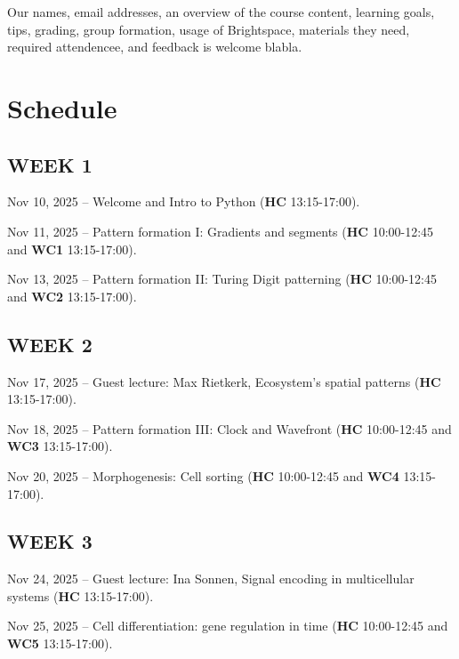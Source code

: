 \documentclass[
  letterpaper,
  DIV=11,
  numbers=noendperiod]{scrreprt}
\theoremstyle{definition}
\theoremstyle{remark}
\begin{document}
Our names, email addresses, an overview of the course content, learning
goals, tips, grading, group formation, usage of Brightspace, materials
they need, required attendencee, and feedback is welcome blabla.

\chapter{Schedule}\label{schedule}

\section*{WEEK 1}\label{week-1}


Nov 10, 2025 -- Welcome and Intro to Python (\textbf{HC} 13:15-17:00).

Nov 11, 2025 -- Pattern formation I: Gradients and segments (\textbf{HC}
10:00-12:45 and \textbf{WC1} 13:15-17:00).

Nov 13, 2025 -- Pattern formation II: Turing Digit patterning
(\textbf{HC} 10:00-12:45 and \textbf{WC2} 13:15-17:00).

\section*{WEEK 2}\label{week-2}


Nov 17, 2025 -- Guest lecture: Max Rietkerk, Ecosystem's spatial
patterns (\textbf{HC} 13:15-17:00).

Nov 18, 2025 -- Pattern formation III: Clock and Wavefront (\textbf{HC}
10:00-12:45 and \textbf{WC3} 13:15-17:00).

Nov 20, 2025 -- Morphogenesis: Cell sorting (\textbf{HC} 10:00-12:45 and
\textbf{WC4} 13:15-17:00).

\section*{WEEK 3}\label{week-3}


Nov 24, 2025 -- Guest lecture: Ina Sonnen, Signal encoding in
multicellular systems (\textbf{HC} 13:15-17:00).

Nov 25, 2025 -- Cell differentiation: gene regulation in time
(\textbf{HC} 10:00-12:45 and \textbf{WC5} 13:15-17:00).
\end{document}
